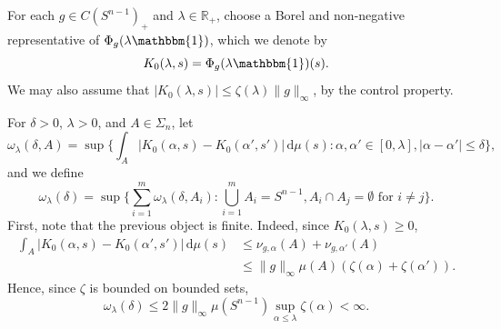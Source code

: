\documentclass[11pt, a4paper]{amsart}
\renewcommand{\d}{\,\mathrm{d}}
\newcommand{\uno}{\operatorname{\mathbbm{1}}}
\newcommand{\sn}{{S^{n-1}}}
\renewcommand{\d}{\,\mathrm{d}}
\begin{document}
For each $g\in C(\sn)_+$ and $\lambda\in\mathbb{R}_+$, choose a Borel and non-negative representative of $\Phi_g(\lambda{\uno})$, which we denote by
\begin{equation}\label{eq:def_K0}
    K_0(\lambda,s)=\Phi_g(\lambda{\uno})(s).
\end{equation}
We may also assume that $|K_0(\lambda,s)|\leq \zeta (\lambda)\|g\|_{\scriptscriptstyle \infty}$, by the control property.


For $\delta>0$, $\lambda>0$, and $A\in\Sigma_n$, let 
\[
    \omega_\lambda(\delta,A)=\sup\Big\{\int_A|K_0(\alpha,s)-K_0(\alpha',s')|\d \mu(s):\alpha,\alpha'\in[0,\lambda],|\alpha-\alpha'|\leq \delta  \Big\},
\]
and we define
\[
    \omega_\lambda(\delta)=\sup\big\{\sum_{i=1}^m\omega_\lambda(\delta,A_i):\bigcup_{i=1}^mA_i=\sn, A_i\cap A_j=\emptyset \text{ for }i\neq j\big\}.
\]
First, note that the previous object is finite. Indeed, since $K_0(\lambda,s)\geq 0$,
\begin{align*}
    \int_A|K_0(\alpha,s)-K_0(\alpha',s')|\d \mu(s)&\leq\nu_{g,\alpha}(A)+\nu_{g,\alpha'}(A)\\
    &\leq \|g\|_{\scriptscriptstyle \infty} \mu(A) (\zeta(\alpha)+\zeta(\alpha')).
\end{align*}
Hence, since $\zeta$ is bounded on bounded sets,
\[
    \omega_\lambda(\delta)\leq 2\|g\|_{\scriptscriptstyle \infty} \mu(\sn)\sup_{\alpha\leq \lambda}\zeta(\alpha)<\infty.
\]
\end{document}
